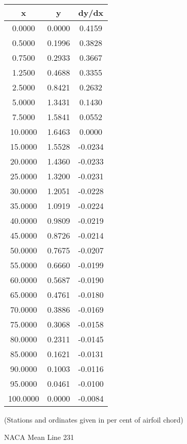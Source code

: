 \documentclass[11pt]{book}
\begin{document}
 \vspace{8mm}
 \begin{tabular}{|c|c|c|}  \hline
 x & y & dy/dx \\
 \hline
0.0000 & 0.0000 & 0.4159 \\
0.5000 & 0.1996 & 0.3828 \\
0.7500 & 0.2933 & 0.3667 \\
1.2500 & 0.4688 & 0.3355 \\
2.5000 & 0.8421 & 0.2632 \\
5.0000 & 1.3431 & 0.1430 \\
7.5000 & 1.5841 & 0.0552 \\
10.0000 & 1.6463 & 0.0000 \\
15.0000 & 1.5528 & -0.0234 \\
20.0000 & 1.4360 & -0.0233 \\
25.0000 & 1.3200 & -0.0231 \\
30.0000 & 1.2051 & -0.0228 \\
35.0000 & 1.0919 & -0.0224 \\
40.0000 & 0.9809 & -0.0219 \\
45.0000 & 0.8726 & -0.0214 \\
50.0000 & 0.7675 & -0.0207 \\
55.0000 & 0.6660 & -0.0199 \\
60.0000 & 0.5687 & -0.0190 \\
65.0000 & 0.4761 & -0.0180 \\
70.0000 & 0.3886 & -0.0169 \\
75.0000 & 0.3068 & -0.0158 \\
80.0000 & 0.2311 & -0.0145 \\
85.0000 & 0.1621 & -0.0131 \\
90.0000 & 0.1003 & -0.0116 \\
95.0000 & 0.0461 & -0.0100 \\
100.0000 & 0.0000 & -0.0084 \\
 \hline
 \end{tabular}
 \vspace{8mm}

(Stations and ordinates given in per cent of airfoil chord)

 \newpage
 \label{ml231}
 \begin{Large}
 NACA Mean Line 231
 \end{Large}
  
\end{document}
